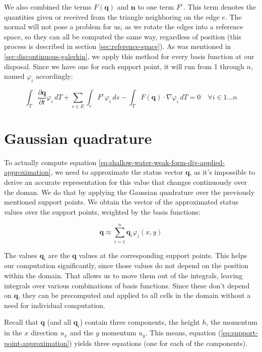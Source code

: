 \documentclass{article}
\newcommand{\pd}[2]{\dfrac{\partial #1}{\partial #2}}
\renewcommand{\phi}{\varphi}
\begin{document}
We also combined the terms $F(\mathbf{q})$ and $\mathbf{n}$ to one term $F^e$. This term denotes the quantities given or received from the triangle neighboring on the edge $e$. The normal will not pose a problem for us, as we rotate the edges into a reference space, so they can all be computed the same way, regardless of position (this process is described in section \ref{sec:reference-space}). As was mentioned in \ref{sec:discontinuous-galerkin}, we apply this method for every basis function at our disposal. Since we have one for each support point, it will run from 1 through $n$, named $\phi_i$ accordingly:

\begin{equation}
  \label{eq:shallow-water-weak-form-div-applied-approximation}
  \int_T \pd {\mathbf{q}}{t} \phi_i \, dT +
  \sum_{e \in E} \int_{e} F^e \phi_i \, ds  -
  \int_T F(\mathbf{q}) \cdot \nabla \phi_i \, dT = 0
  \quad \forall i \in {1 \dots n}
\end{equation}

\section{Gaussian quadrature}
\label{sec:matrix-extraction}

To actually compute equation \ref{eq:shallow-water-weak-form-div-applied-approximation}, we need to approximate the status vector $\mathbf{q}$, as it's impossible to derive an accurate representation for this value that changes continuously over the doman.
We do that by applying the Gaussian quadrature over the previously mentioned support points.
We obtain the vector of the approximated status values over the support points, weighted by the basis functions:

\begin{equation}
  \label{eq:support-point-approximation}
  \mathbf{q} \approx \sum_{i=1}^n \mathbf{q}_i \phi_i\left(x,y\right)
\end{equation}

The values $\mathbf{q}_i$ are the $\mathbf{q}$ values at the corresponding support points. This helps our computation significantly, since those values do not depend on the position within the domain. That allows us to move them out of the integrals, leaving integrals over various combinations of basis functions. Since these don't depend on $\mathbf{q}$, they can be precomputed and applied to all cells in the domain without a need for individual computation.

Recall that $\mathbf{q}$ (and all $\mathbf{q}_i$) contain three components, the height $h$, the momentum in the $x$ direction $u_x$ and the $y$ momentum $u_y$. This means, equation (\ref{eq:support-point-approximation}) yields three equations (one for each of the components).
\end{document}

